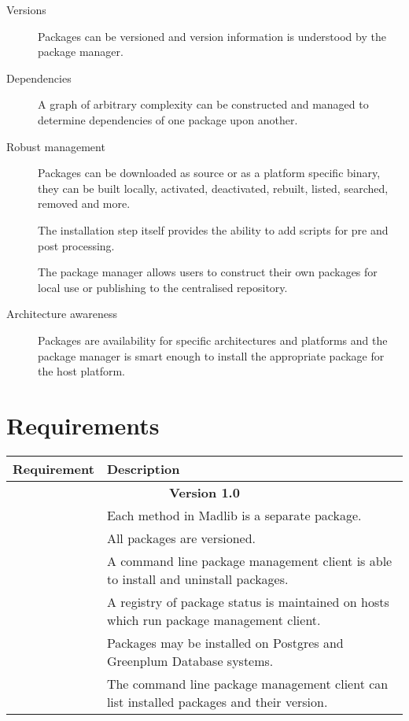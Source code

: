 \documentclass[11pt]{article}
\begin{document}
{\begin{description}
	\item[Versions] Packages can be versioned and version information is
	understood by the package manager.

	\item[Dependencies] A graph of arbitrary complexity can be constructed and
	managed to determine dependencies of one package upon another.

	\item[Robust management] Packages can be downloaded as source or as a
	platform specific binary, they can be built locally, activated, deactivated,
	rebuilt, listed, searched, removed and more.
	
	The installation step itself provides the ability to add scripts for pre and
	post processing.

	The package manager allows users to construct their own packages for local
	use or publishing to the centralised repository.

	\item[Architecture awareness] Packages are availability for specific
	architectures and platforms and the package manager is smart enough to
	install the appropriate package for the host platform.

\end{description}

\ifx\pdfoutput\undefined %
\else
{}
\fi

\section{Requirements}

\begin{mlreq}
\begin{tabular}{|l|p{133mm}|}
\hline
	\textbf{Requirement} & \textbf{Description} \\
\hline
	\multicolumn{2}{|c|}{\bf Version 1.0} \\
\hline
	\mlr & Each method in Madlib is a separate package. \\
\hline
	\mlr & All packages are versioned. \\
\hline
	\mlr & A command line package management client is able to install
	       and uninstall packages. \\
\hline
	\mlr & A registry of package status is maintained on hosts which run
		   package management client. \\
\hline
	\mlr & Packages may be installed on Postgres and Greenplum Database
		   systems. \\
\hline
	\mlr & The command line package management client can list installed
		   packages and their version. \\


\end{tabular}
\end{mlreq}}
\end{document}
